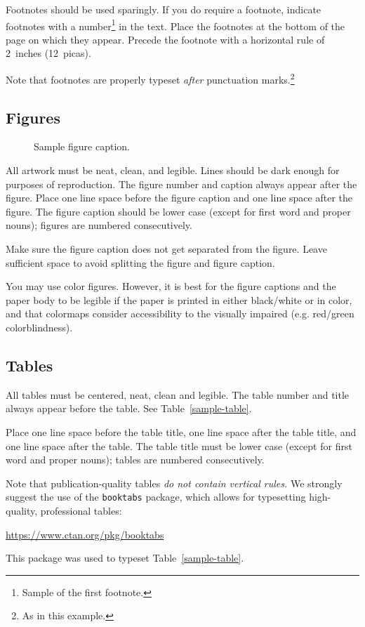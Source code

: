 \documentclass{article}
\begin{document}
Footnotes should be used sparingly.  If you do require a footnote, indicate
footnotes with a number\footnote{Sample of the first footnote.} in the
text. Place the footnotes at the bottom of the page on which they appear.
Precede the footnote with a horizontal rule of 2~inches (12~picas).

Note that footnotes are properly typeset \emph{after} punctuation
marks.\footnote{As in this example.}

\subsection{Figures}

\begin{figure}
  \centering
  \fbox{\rule[-.5cm]{0cm}{4cm} \rule[-.5cm]{4cm}{0cm}}
  \caption{Sample figure caption.}
\end{figure}

All artwork must be neat, clean, and legible. Lines should be dark enough for
purposes of reproduction. The figure number and caption always appear after the
figure. Place one line space before the figure caption and one line space after
the figure. The figure caption should be lower case (except for first word and
proper nouns); figures are numbered consecutively.

Make sure the figure caption does not get separated from the figure. Leave sufficient space to avoid splitting the figure and figure caption.

You may use color figures.  However, it is best for the figure captions and the
paper body to be legible if the paper is printed in either black/white or in
color, and that colormaps consider accessibility to the visually impaired (e.g. red/green colorblindness).

\subsection{Tables}

All tables must be centered, neat, clean and legible.  The table number and
title always appear before the table.  See Table~\ref{sample-table}.

Place one line space before the table title, one line space after the
table title, and one line space after the table. The table title must
be lower case (except for first word and proper nouns); tables are
numbered consecutively.

Note that publication-quality tables \emph{do not contain vertical rules.} We
strongly suggest the use of the \verb+booktabs+ package, which allows for
typesetting high-quality, professional tables:
\begin{center}
  \url{https://www.ctan.org/pkg/booktabs}
\end{center}
This package was used to typeset Table~\ref{sample-table}.
\end{document}
